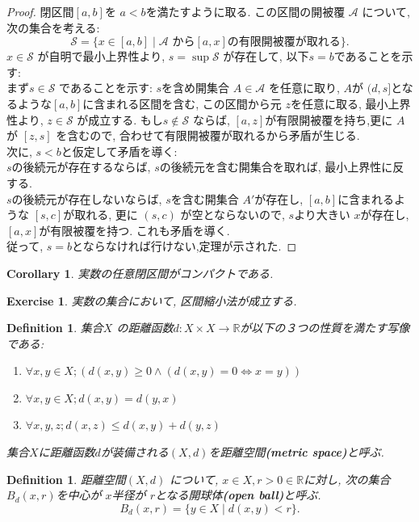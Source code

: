 \documentclass[dvipdfmx]{jbook}
\newtheorem{corollary}[theorem]{Corollary}
\newtheorem{definition}[theorem]{Definition}
\theoremstyle{remark}
\theoremstyle{plain}
\newtheorem{exercise}[theorem]{Exercise}
\begin{document}
\begin{proof}
	閉区間$[a,b]$を $a<b$を満たすように取る. この区間の開被覆 $\mathcal{A}$ について, 次の集合を考える:
	\[
		\mathcal{S} = \{ x \in [a,b]  \mid  \text{$\mathcal{A}$ から$[a,x]$の有限開被覆が取れる}\} 
	.\] 
	$x \in \mathcal{S}$ が自明で最小上界性より, $s = \sup \mathcal{S}$ が存在して, 以下$s =b$であることを示す:\\
	まず$s \in \mathcal{S}$ であることを示す: $s$を含め開集合 $A\in \mathcal{A}$ を任意に取り, $A$が $(d,s]$となるような$[a,b]$に含まれる区間を含む, この区間から元 $z$を任意に取る, 最小上界性より,  $z \in \mathcal{S}$ が成立する. もし$s \not\in \mathcal{S}$ ならば, $[a,z]$が有限開被覆を持ち,更に $A$が $[z,s]$ を含むので, 合わせて有限開被覆が取れるから矛盾が生じる.\\
	次に, $s <b$と仮定して矛盾を導く: \\
	 $s$の後続元が存在するならば,  $s$の後続元を含む開集合を取れば, 最小上界性に反する.\\
	 $s$の後続元が存在しないならば,  $s$を含む開集合 $A'$が存在し,  $[a,b]$に含まれるような $[s,c]$が取れる, 更に $\left( s,c \right) $ が空とならないので, $s$より大きい $x$が存在し,  $[a,x]$が有限被覆を持つ. これも矛盾を導く. \\
	 従って,  $s=b$とならなければ行けない,定理が示された.
\end{proof}

\begin{corollary}
	実数の任意閉区間がコンパクトである.
\end{corollary}

\begin{exercise}
	実数の集合において, 区間縮小法が成立する.
\end{exercise}

\begin{definition}
	集合$X$ の距離函数$d : X \times X \to \mathbb{R}$が以下の３つの性質を満たす写像である:
	\begin{enumerate}
		\item $\forall x  , y \in X ; \left( d(x,y) \ge 0 \land \left( d(x,y) = 0  \iff x = y \right) \right)$ 
		\item $\forall x, y \in X; d(x,y) = d(y,x)$
		\item  $\forall x,y,z ; d(x,z) \le d(x,y) + d(y,z)$
	\end{enumerate}
	集合$X$に距離函数$d$が装備される$(X,d)$を距離空間\textbf{(metric space)}と呼ぶ.
\end{definition}

\begin{definition}
	距離空間$\left( X,d \right) $ について, $x \in X, r>0 \in  \mathbb{R}$に対し, 次の集合$B_d (x,r)$を中心が $x$半径が $r$となる開球体\textbf{(open ball)}と呼ぶ.
	 \[
	B_d(x,r) = \{y \in X \mid d(x,y) <r\} 
	.\] 
\end{definition}
\end{document}

